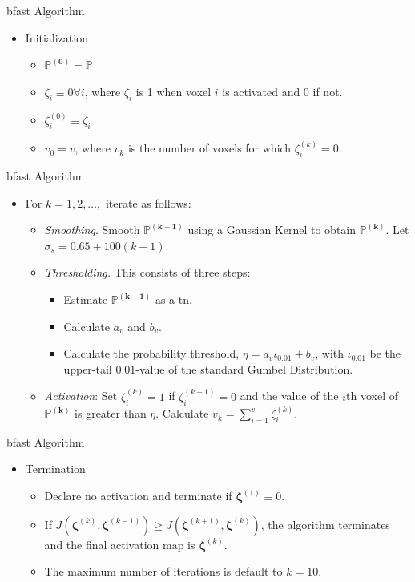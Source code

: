 \documentclass{beamer}
\begin{document}
\begin{frame}{\gls{bfast} Algorithm}
\begin{itemize}
\item Initialization
\begin{itemize}
\item $\bm{\mathbb{P}^{(0)}} = \bm{\mathbb{P}}$
\item $\zeta_i \equiv 0 \forall i$, where $\zeta_i$ is 1 when voxel $i$ is activated and 0 if not.
\item $\zeta_i^{(0)} \equiv \zeta_i$
\item $v_0 = v$, where $v_k$ is the number of voxels for which $\zeta_i^{(k)} = 0$.
\end{itemize}
\end{itemize}
\end{frame}

\begin{frame}{\gls{bfast} Algorithm}
\begin{itemize}
\item For $k=1,2,\dots,$ iterate as follows:
\begin{itemize}
\item \textit{Smoothing}. Smooth $\bm{\mathbb{P}^{(k-1)}}$ using a Gaussian Kernel to obtain $\bm{\mathbb{P}^{(k)}}$. Let $\sigma_s = 0.65 + 100(k - 1)$.
\item \textit{Thresholding.} This consists of three steps:
\begin{itemize}
\item Estimate $\bm{\mathbb{P}^{(k-1)}}$ as a \gls{tn}.
\item Calculate $a_v$ and $b_v$.
\item Calculate the probability threshold, $\eta=a_v\iota_{0.01}+b_v$, with $\iota_{0.01}$ be the upper-tail $0.01$-value of the standard Gumbel Distribution.
\end{itemize}
\item \textit{Activation}: Set $\zeta_i^{(k)} = 1$ if $\zeta_i^{(k-1)} = 0$ and the value of the $i$th voxel of $\bm{\mathbb{P}^{(k)}}$ is greater than $\eta$. Calculate $v_k=\sum_{i=1}^v\zeta_i^{(k)}$.
\end{itemize}
\end{itemize}
\end{frame}

\begin{frame}{\gls{bfast} Algorithm}
\begin{itemize}
\item Termination
\begin{itemize}
\item Declare no activation and terminate if $\bm{\zeta}^{(1)} \equiv 0$.
\item If $J(\bm{\zeta}^{(k)},\bm{\zeta}^{(k-1)}) \geq J(\bm{\zeta}^{(k+1)},\bm{\zeta}^{(k)})$, the algorithm terminates and the final activation map is $\bm{\zeta}^{(k)}$.
\item The maximum number of iterations is default to $k=10$.
\end{itemize}
\end{itemize}
\end{frame}
\end{document}
